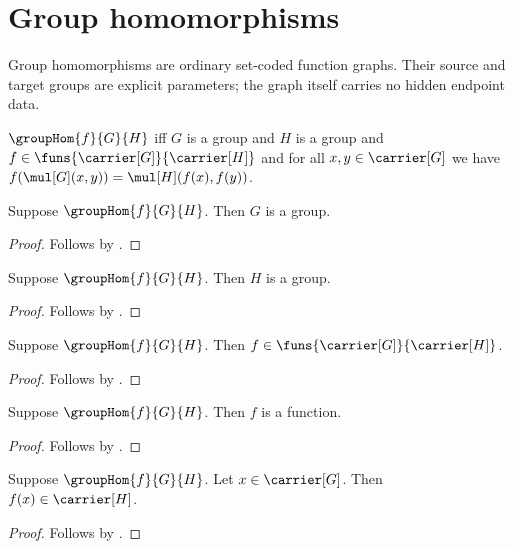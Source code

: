 


\section{Group homomorphisms}

Group homomorphisms are ordinary set-coded function graphs.  Their source and
target groups are explicit parameters; the graph itself carries no hidden
endpoint data.

\begin{definition}\label{group_hom}
    $\groupHom{f}{G}{H}$ iff
        $G$ is a group and $H$ is a group and
        $f\in\funs{\carrier[G]}{\carrier[H]}$ and
        for all $x,y\in\carrier[G]$ we have
            $f(\mul[G](x,y))=\mul[H](f(x),f(y))$.
\end{definition}

\begin{proposition}\label{group_hom_source_group}
    Suppose $\groupHom{f}{G}{H}$.
    Then $G$ is a group.
\end{proposition}
\begin{proof}
    Follows by .
\end{proof}

\begin{proposition}\label{group_hom_target_group}
    Suppose $\groupHom{f}{G}{H}$.
    Then $H$ is a group.
\end{proposition}
\begin{proof}
    Follows by .
\end{proof}

\begin{proposition}\label{group_hom_type}
    Suppose $\groupHom{f}{G}{H}$.
    Then $f\in\funs{\carrier[G]}{\carrier[H]}$.
\end{proposition}
\begin{proof}
    Follows by .
\end{proof}

\begin{corollary}\label{group_hom_is_function}
    Suppose $\groupHom{f}{G}{H}$.
    Then $f$ is a function.
\end{corollary}
\begin{proof}
    Follows by .
\end{proof}

\begin{corollary}\label{group_hom_apply_type}
    Suppose $\groupHom{f}{G}{H}$.
    Let $x\in\carrier[G]$.
    Then $f(x)\in\carrier[H]$.
\end{corollary}
\begin{proof}
    Follows by .
\end{proof}

